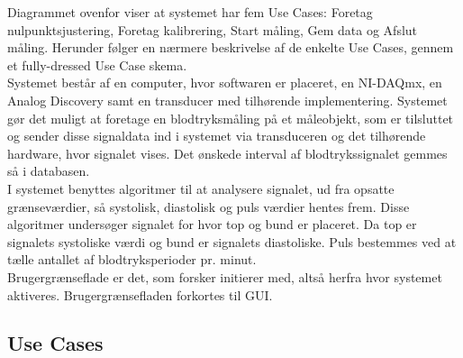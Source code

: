 Diagrammet ovenfor viser at systemet har fem Use Cases: Foretag nulpunktsjustering, Foretag kalibrering, Start måling, Gem data og Afslut måling. Herunder følger en nærmere beskrivelse af de enkelte Use Cases, gennem et fully-dressed Use Case skema. \\
Systemet består af en computer, hvor softwaren er placeret, en NI-DAQmx, en Analog Discovery samt en transducer med tilhørende implementering. Systemet gør det muligt at foretage en blodtryksmåling på et måleobjekt, som er tilsluttet og sender disse signaldata ind i systemet via transduceren og det tilhørende hardware, hvor signalet vises. Det ønskede interval af blodtrykssignalet gemmes så i databasen. \\
I systemet benyttes algoritmer til at analysere signalet, ud fra opsatte grænseværdier, så systolisk, diastolisk og puls værdier hentes frem. Disse algoritmer undersøger signalet for hvor top og bund er placeret. Da top er signalets systoliske værdi og bund er signalets diastoliske. Puls bestemmes ved at tælle antallet af blodtryksperioder pr. minut. \\    
Brugergrænseflade er det, som forsker initierer med, altså herfra hvor systemet aktiveres. Brugergrænsefladen forkortes til GUI. 

\subsection{Use Cases}


